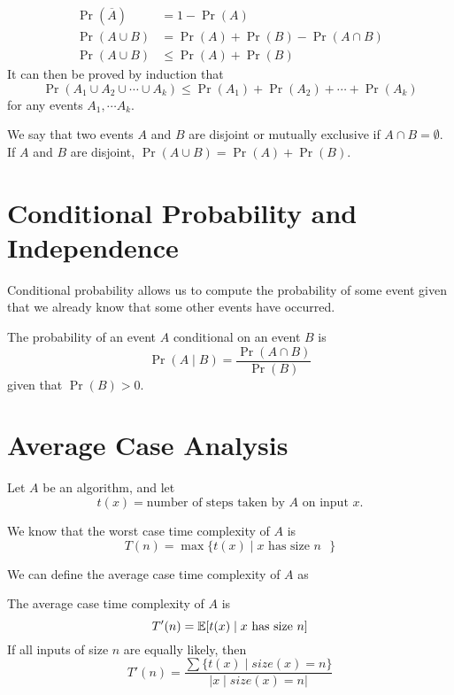 \begin{theorem}
    $$
    \begin{aligned}
        \Pr(\overline{A}) &= 1 - \Pr(A) \\
        \Pr(A \cup B) &= \Pr(A) + \Pr(B) - \Pr(A \cap B) \\
        \Pr(A \cup B) &\leq \Pr(A) + \Pr(B)
    \end{aligned}
    $$
    It can then be proved by induction that
    $$
    \Pr(A_1 \cup A_2 \cup \cdots \cup A_k) \leq \Pr(A_1) + \Pr(A_2) + \cdots + \Pr(A_k)
    $$
    for any events $A_1, \cdots A_k$.
\end{theorem}

We say that two events $A$ and $B$ are disjoint or mutually exclusive if $A \cap B = \emptyset$. If $A$ and $B$ are disjoint, $\Pr(A \cup B) = \Pr(A) + \Pr(B)$.

\section{Conditional Probability and Independence}

Conditional probability allows us to compute the probability of some event given that we already know that some other events have occurred.

\begin{definition} 
    The probability of an event $A$ conditional on an event $B$ is
    $$
    \Pr(A \mid B) = \frac{\Pr(A \cap B)}{\Pr(B)}
    $$
    given that $\Pr(B) > 0$. 
\end{definition}

\section{Average Case Analysis}

Let $A$ be an algorithm, and let
\[
t(x) = \text{number of steps taken by $A$ on input $x$}
.\] 

We know that the worst case time complexity of $A$ is
$$
T(n) = \max \{ t(x) \mid \text{$x$ has size $n$ } \}
$$

We can define the average case time complexity of $A$ as

\begin{definition} 
    The average case time complexity of $A$ is
    $$
    T'(n) = \operatorname*{\mathbb{E}} [ t(x) \mid \text{$x$ has size $n$} ]
    $$
    If all inputs of size $n$ are equally likely, then
    $$
    T'(n) = \frac{\sum \{ t(x) \mid size(x) = n \}}{| x \mid size(x) = n |}
    $$
\end{definition}

